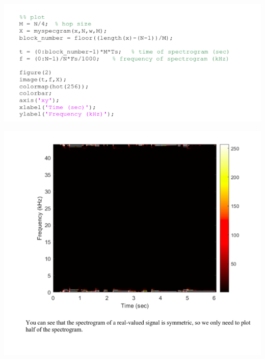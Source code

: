 \documentclass[a4paper]{article}
\begin{document}
	\begin{center}
		\includegraphics[width=1\linewidth]{screenshot104}
	\end{center}
	
	
	\begin{center}
		\includegraphics[width=1\linewidth]{screenshot105}
	\end{center}
	
\end{document}
